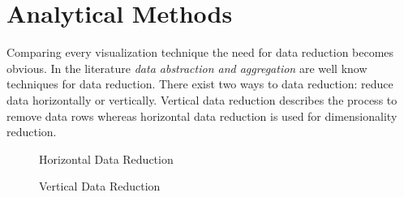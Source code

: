 \section{Analytical Methods}\label{analytical}
Comparing every visualization technique the need for data reduction becomes obvious. In the literature \textit{data abstraction and aggregation} are well know techniques for data reduction\cite{FerreiradeOliveira2003,Aigner2011, Keim2005}. There exist two ways to data reduction: reduce data horizontally or vertically. 
Vertical data reduction describes the process to remove data rows whereas horizontal data reduction is used for dimensionality reduction. 
\begin{figure}[H]
    \centering
    \caption{Horizontal Data Reduction}
    \label{fig:my_label}
\end{figure}

\begin{figure}[H]
    \centering
    \caption{Vertical Data Reduction}
    \label{fig:my_label}
\end{figure}

